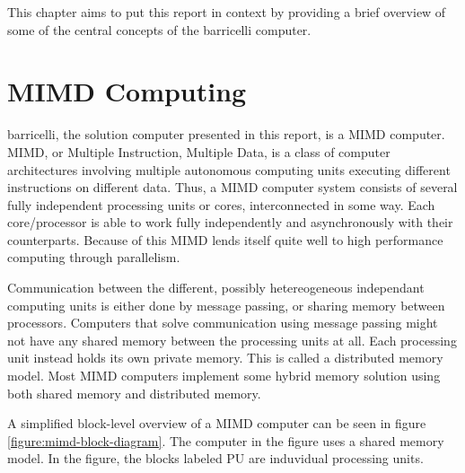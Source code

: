 This chapter aims to put this report in context by providing a brief overview of some of the central concepts of the \Gls{barricelli} computer.

\section{MIMD Computing}

\Gls{barricelli}, the solution computer presented in this report, is a \Gls{MIMD} computer. \Gls{MIMD}, or Multiple Instruction, Multiple Data, is a class of computer architectures involving multiple autonomous computing units executing different instructions on different data.
Thus, a MIMD computer system consists of several fully independent processing units or cores, interconnected in some way.
Each core/processor is able to work fully independently and asynchronously with their counterparts.
Because of this MIMD lends itself quite well to high performance computing through parallelism.

Communication between the different, possibly hetereogeneous independant computing units is either done by message passing, or sharing memory between processors.
Computers that solve communication using message passing might not have any shared memory between the processing units at all.
Each processing unit instead holds its own private memory.
This is called a distributed memory model.
Most MIMD computers implement some hybrid memory solution using both shared memory and distributed memory.

A simplified block-level overview of a MIMD computer can be seen in figure \vref{figure:mimd-block-diagram}.
The computer in the figure uses a shared memory model.
In the figure, the blocks labeled PU are induvidual processing units.

